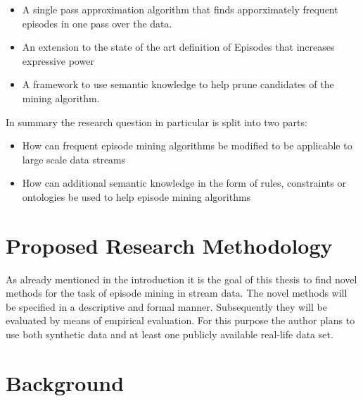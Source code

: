 \documentclass[journal]{IEEEtran}
\begin{document}
\begin{itemize}
	\item A single pass approximation algorithm that finds apporximately frequent episodes in one pass over the data.
	\item An extension to the state of the art definition of Episodes that increases expressive power
	\item A framework to use semantic knowledge to help prune candidates of the mining algorithm.
\end{itemize}

In summary the research question in particular is split into two parts:\newline 
\begin{itemize}
\item How can frequent episode mining algorithms be modified to be applicable to large scale data streams
\item How can additional semantic knowledge in the form of rules, constraints or ontologies be used to help episode mining algorithms

\end{itemize}


\section{Proposed Research Methodology}
As already mentioned in the introduction it is the goal of this thesis to find novel methods for the task of episode mining in stream data. The novel methods will be specified in a descriptive and formal manner. Subsequently they will be evaluated by means of empirical evaluation. For this purpose the author plans to use both synthetic data and at least one publicly available real-life data set.


\section{Background}
\end{document}
